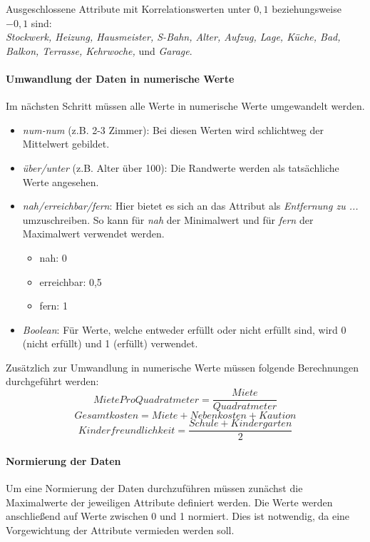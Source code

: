 Ausgeschlossene Attribute mit Korrelationswerten unter $0,1$ beziehungsweise $-0,1$ sind:\\
\emph{Stockwerk, Heizung, Hausmeister, S-Bahn, Alter, Aufzug, Lage, Küche, Bad, Balkon, Terrasse, Kehrwoche,}
und \emph{Garage}.\\

\paragraph{Umwandlung der Daten in numerische Werte}
Im nächsten Schritt müssen alle Werte in numerische Werte umgewandelt werden.
\begin{itemize}
    \item \textit{num-num} (z.B. 2-3 Zimmer):  Bei diesen Werten wird schlichtweg der Mittelwert gebildet.
    \item \textit{über/unter} (z.B. Alter über 100): Die Randwerte werden als tatsächliche Werte angesehen.
    \item \textit{nah/erreichbar/fern}: Hier bietet es sich an das Attribut als \textit{Entfernung zu ...} umzuschreiben.
                So kann für \textit{nah} der Minimalwert und für \textit{fern} der Maximalwert verwendet werden.
    \begin{itemize}
        \item nah: 0
        \item erreichbar: 0,5
        \item fern: 1
    \end{itemize}
    \item \textit{Boolean}: Für Werte, welche entweder erfüllt oder nicht erfüllt sind, wird 0 (nicht erfüllt) und 1 (erfüllt) verwendet.
\end{itemize}

Zusätzlich zur Umwandlung in numerische Werte müssen folgende Berechnungen durchgeführt werden:
\begin{equation}
        MieteProQuadratmeter = \frac{Miete}{Quadratmeter}
\end{equation}
\begin{equation}
    Gesamtkosten = Miete + Nebenkosten + Kaution
\end{equation}
\begin{equation}
    Kinderfreundlichkeit = \frac{Schule + Kindergarten}{2}
\end{equation}

\paragraph{Normierung der Daten}
Um eine Normierung der Daten durchzuführen müssen zunächst die Maximalwerte der
jeweiligen Attribute definiert werden. Die Werte werden anschließend auf Werte
zwischen 0 und 1 normiert. Dies ist notwendig, da eine Vorgewichtung der Attribute
vermieden werden soll.

